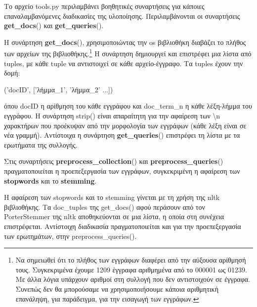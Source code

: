 \documentclass[12pt]{report}
\begin{document}
            Το αρχείο {\fontCode\small tools.py} περιλαμβάνει βοηθητικές συναρτήσεις για κάποιες επαναλαμβανόμενες διαδικασίες της υλοποίησης.
            Περιλαμβάνονται οι συναρτήσεις {\fontCode\small \textbf{get\_docs}()} και {\fontCode\small \textbf{get\_queries}()}.

            Η συνάρτηση {\fontCode\small \textbf{get\_docs}()}, χρησιμοποιώντας την {\fontCode\small os} βιβλιοθήκη
            διαβάζει το πλήθος των αρχείων της βιβλιοθήκης.\footnote{Να σημειωθεί ότι το πλήθος των εγγράφων διαφέρει από την αύξουσα αρίθμησή τους. Συγκεκριμένα έχουμε 1209 έγγραφα αριθμημένα από το {\fontCode\scriptsize 000001} ως {\fontCode\scriptsize 01239}. Με άλλα λόγια υπάρχουν αριθμοί στη συλλογή που δεν αντιστοιχούν σε έγγραφα. Συνεπώς δεν θα μπορούσαμε να χρησιμοποιήσουμε κάποια αριθμητική επανάληψη, για παράδειγμα, για την εισαγωγή των εγγράφων.}
            Η συνάρτηση δημιουργεί και επιστρέφει μια λίστα από tuples, με κάθε tuple να αντιστοιχεί σε κάθε αρχείο-έγγραφο. Τα tuples έχουν την δομή:

                \begin{graycomment} \centering
                {\fontCode\footnotesize ('docID', ['λήμμα\_1', 'λήμμα\_2' ...])}
                \end{graycomment}

            \noindent όπου {\fontCode\small docID} η αρίθμηση του κάθε εγγράφου και {\fontCode\small doc\_term\_n} η κάθε λέξη-λήμμα του εγγράφου.
            Η συνάρτηση {\fontCode\small strip()} είναι απαραίτητη για την αφαίρεση των {\fontCode\small \textbackslash n} χαρακτήρων
            που προέκυψαν από την μορφολογία των εγγράφων (κάθε λέξη είναι σε νέα γραμμή).
            Αντίστοιχα η συνάρτηση {\fontCode\small \textbf{get\_queries}()} επιστρέφει τη λίστα με τα ερωτήματα της συλλογής.

            Στις συναρτήσεις {\fontCode\small \textbf{preprocess\_collection}()} και {\fontCode\small \textbf{preprocess\_queries}()}
            πραγματοποιείται η προεπεξεργασία των εγγράφων, συγκεκριμένη η αφαίρεση των \textbf{stopwords} και το \textbf{stemming}.


            Η αφαίρεση των stopwords και το stemming γίνεται με τη χρήση της {\fontCode\small nltk} βιβλιοθήκης. Τα {\fontCode\small doc\_tuples} της
            {\fontCode\small get\_docs()} αφού περάσουν από τον {\fontCode\small PorterStemmer} της {\fontCode\small nltk} αποθηκεύονται σε μια λίστα,
            η οποία στη συνέχεια επιστρέφεται.
            Αντίστοιχη διαδικασία πραγματοποιείται και για την προεπεξεργασία των ερωτημάτων, στην {\fontCode\small preprocess\_queries()}.
\end{document}
